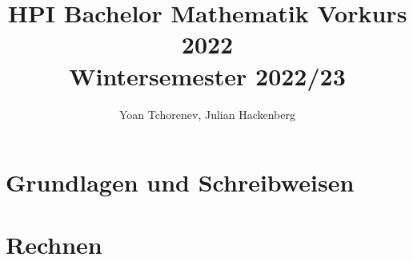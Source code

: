 \documentclass[12pt,a4paper]{article}
\title{%
    HPI Bachelor Mathematik Vorkurs 2022 \\
    \large Wintersemester 2022/23 \\
}
\author{Yoan Tchorenev, Julian Hackenberg}
\begin{document}
    \begin{titlepage}
        \maketitle
        \tableofcontents
    \end{titlepage}

    \part{Grundlagen und Schreibweisen}\label{part:grundlagen-und-schreibweisen}
    

    \part{Rechnen}\label{part:rechnen}
    
\end{document}
